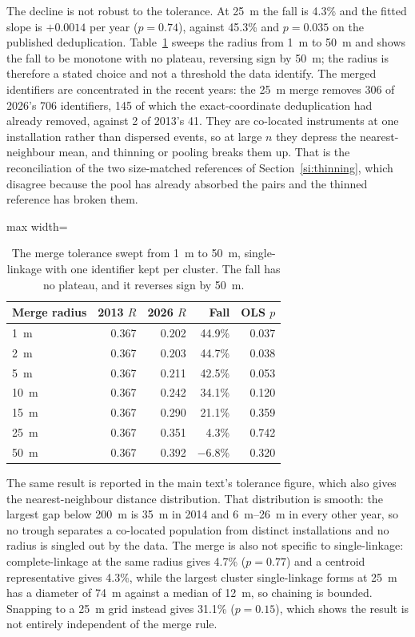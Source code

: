 \documentclass[fleqn,10pt]{wlpeerj}
\begin{document}
The decline is not robust to the tolerance. At \SI{25}{\meter} the fall is 4.3\% and
the fitted slope is
$+0.0014$ per year ($p = 0.74$), against 45.3\% and $p = 0.035$ on the
published deduplication. Table~\ref{si:ndsweep} sweeps the radius from \SI{1}{\meter} to
\SI{50}{\meter} and shows the fall to be monotone with no plateau, reversing sign by
\SI{50}{\meter}; the radius is therefore a stated choice and not a threshold the data identify.
The merged identifiers are concentrated in the recent years:
the \SI{25}{\meter} merge removes 306 of 2026's 706 identifiers, 145 of which
the exact-coordinate deduplication had already removed, against
2 of 2013's 41. They are co-located instruments at one installation rather
than dispersed events, so at large $n$ they depress the nearest-neighbour mean, and thinning or
pooling breaks them up. That is the reconciliation of the two size-matched references of
Section~\ref{si:thinning}, which disagree because the pool has already absorbed the pairs and
the thinned reference has broken them.

\begin{table}[H]
\centering
\caption{The merge tolerance swept from \SI{1}{\meter} to \SI{50}{\meter}, single-linkage with one identifier kept per cluster. The fall has no plateau, and it reverses sign by \SI{50}{\meter}.}
\label{si:ndsweep}
\small
\begin{adjustbox}{max width=\linewidth}
\begin{tabular}{lrrrr}
\toprule
Merge radius & 2013 $R$ & 2026 $R$ & Fall & OLS $p$ \\
\midrule
\SI{1}{\meter} & 0.367 & 0.202 & 44.9\% & 0.037 \\
\SI{2}{\meter} & 0.367 & 0.203 & 44.7\% & 0.038 \\
\SI{5}{\meter} & 0.367 & 0.211 & 42.5\% & 0.053 \\
\SI{10}{\meter} & 0.367 & 0.242 & 34.1\% & 0.120 \\
\SI{15}{\meter} & 0.367 & 0.290 & 21.1\% & 0.359 \\
\SI{25}{\meter} & 0.367 & 0.351 & 4.3\% & 0.742 \\
\SI{50}{\meter} & 0.367 & 0.392 & $-6.8$\% & 0.320 \\
\bottomrule
\end{tabular}
\end{adjustbox}
\end{table}

The same result is reported in the main text's tolerance figure, which also gives the
nearest-neighbour distance distribution. That distribution is smooth: the largest gap below
\SI{200}{\meter} is \SI{35}{\meter} in 2014 and \SIrange{6}{26}{\meter} in every other year, so
no trough separates a co-located population from distinct installations and no radius is
singled out by the data. The merge is also not specific to single-linkage: complete-linkage at
the same radius gives 4.7\% ($p = 0.77$) and a centroid representative gives 4.3\%, while the
largest cluster single-linkage forms at \SI{25}{\meter} has a diameter of \SI{74}{\meter} against
a median of \SI{12}{\meter}, so chaining is bounded. Snapping to a \SI{25}{\meter} grid instead
gives 31.1\% ($p = 0.15$), which shows the result is not entirely independent of the merge rule.
\end{document}
